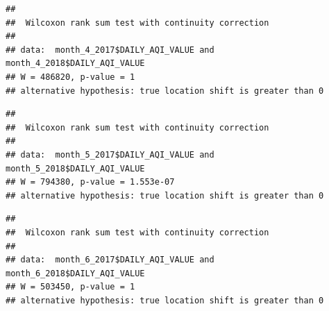 \documentclass[12pt,]{article}
\newenvironment{Shaded}{\begin{snugshade}}{\end{snugshade}}
\newcommand{\KeywordTok}[1]{\textcolor[rgb]{0.13,0.29,0.53}{\textbf{#1}}}
\newcommand{\DataTypeTok}[1]{\textcolor[rgb]{0.13,0.29,0.53}{#1}}
\newcommand{\DecValTok}[1]{\textcolor[rgb]{0.00,0.00,0.81}{#1}}
\newcommand{\StringTok}[1]{\textcolor[rgb]{0.31,0.60,0.02}{#1}}
\newcommand{\OperatorTok}[1]{\textcolor[rgb]{0.81,0.36,0.00}{\textbf{#1}}}
\newcommand{\NormalTok}[1]{#1}
\begin{document}
\begin{Shaded}
\end{Shaded}

\begin{verbatim}
## 
##  Wilcoxon rank sum test with continuity correction
## 
## data:  month_4_2017$DAILY_AQI_VALUE and month_4_2018$DAILY_AQI_VALUE
## W = 486820, p-value = 1
## alternative hypothesis: true location shift is greater than 0
\end{verbatim}

\begin{Shaded}
\end{Shaded}

\begin{verbatim}
## 
##  Wilcoxon rank sum test with continuity correction
## 
## data:  month_5_2017$DAILY_AQI_VALUE and month_5_2018$DAILY_AQI_VALUE
## W = 794380, p-value = 1.553e-07
## alternative hypothesis: true location shift is greater than 0
\end{verbatim}

\begin{Shaded}
\end{Shaded}

\begin{verbatim}
## 
##  Wilcoxon rank sum test with continuity correction
## 
## data:  month_6_2017$DAILY_AQI_VALUE and month_6_2018$DAILY_AQI_VALUE
## W = 503450, p-value = 1
## alternative hypothesis: true location shift is greater than 0
\end{verbatim}
\end{document}
